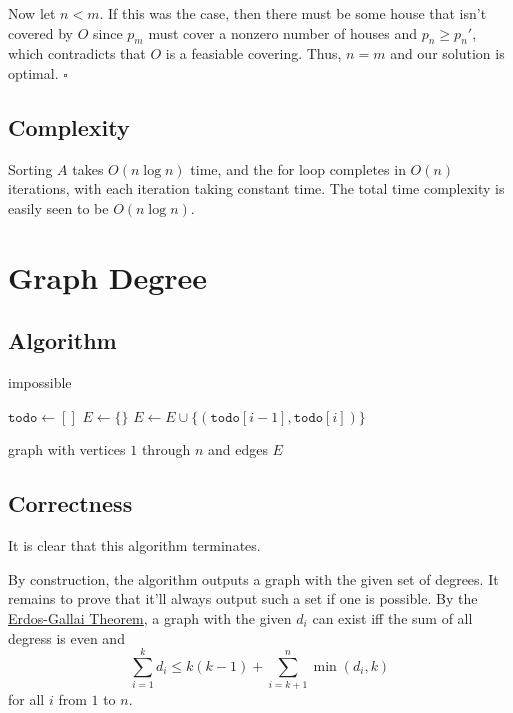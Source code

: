 \documentclass[12pt]{article}
\begin{document}
Now let $n < m$.
If this was the case, then there must be some house that isn't covered by $O$
since $p_m$ must cover a nonzero number of houses and $p_n \ge p_n'$,
which contradicts that $O$ is a feasiable covering.
Thus, $n=m$ and our solution is optimal. $\square$

\subsection{Complexity}

Sorting $A$ takes $O(n \log n)$ time, and the for loop completes in $O(n)$
iterations, with each iteration taking constant time.
The total time complexity is easily seen to be $\boxed{O(n \log n)}$.

\pagebreak

\section{Graph Degree}

\subsection{Algorithm}

\begin{algorithmic}[1]
        \State \Return impossible
    \EndIf

    \item[]
    \State $\texttt{todo} \gets []$
    \State $E \gets \{\}$
        \State $E \gets E \cup \{(\texttt{todo}[i-1], \texttt{todo}[i])\}$
    \EndFor

    \item[]
    \State \Return graph with vertices $1$ through $n$ and edges $E$
\end{algorithmic}

\subsection{Correctness}

It is clear that this algorithm terminates.

By construction, the algorithm outputs a graph with the given set of degrees.
It remains to prove that it'll always output such a set if one is possible.
By the \href{https://en.wikipedia.org/wiki/Erd%C5%91s%E2%80%93Gallai_theorem}{Erdos-Gallai Theorem},
a graph with the given $d_i$ can exist iff the sum of all degress is even and
\[\sum_{i=1}^{k} d_i \le k(k-1)+\sum_{i=k+1}^{n} \min(d_i, k)\]
for all $i$ from $1$ to $n$.
\end{document}
